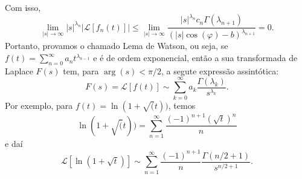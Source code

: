 \begin{exem}
  Com isso,
  \begin{dmath*}
    \lim_{\lvert s \rvert \to \infty} \lvert s \rvert^{\lambda_{n}} \lvert
    \mathcal{L}[f_n(t)] \rvert \leq \lim_{\lvert s \rvert \to \infty}
    \frac{\lvert s \rvert^{\lambda_n} c_n \Gamma(\lambda_{n + 1})}{(\lvert s
    \rvert \cos(\varphi) - b)^{\lambda_{n + 1}}}
    = 0.
  \end{dmath*}
  Portanto, provamos o chamado Lema de Watson, ou seja, se $f(t) = \sum_{n =
  0}^{\infty} a_n t^{\lambda_{n - 1}}$ e é de ordem exponencial, então a sua
  transformada de Laplace $F(s)$ tem, para $\arg(s) < \pi / 2$, a segute
  expressão assintótica:
  \begin{dmath*}
    F(s) = \mathcal{L}[f(t)] \sim \sum_{k = 0}^{\infty} a_k
    \frac{\Gamma(\lambda_k)}{s^{\lambda_k}}.
  \end{dmath*}
  Por exemplo, para $f(t) = \ln(1 + \sqrt(t))$, temos
  \begin{dmath*}
    \ln(1 + \sqrt(t)) = \sum_{n = 1}^{\infty} \frac{(-1)^{n + 1} (\sqrt{t})^n}{n}
  \end{dmath*}
  e daí
  \begin{dmath*}
    \mathcal{L}[\ln(1 + \sqrt{t})] \sim \sum_{n = 1}^{\infty}
    \frac{(-1)^{n + 1}}{n} \frac{\Gamma(n / 2 + 1)}{s^{n / 2 + 1}}.
  \end{dmath*}
\end{exem}
